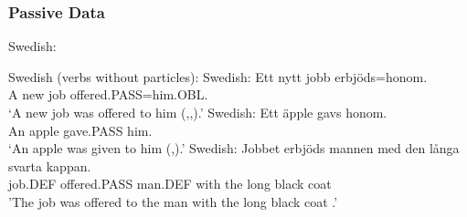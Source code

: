 \subsubsection{Passive Data}
\begin{exe}
	 Swedish:
	\begin{xlist}
	\end{xlist}	
	 Swedish (verbs without particles):
	 Swedish:
		\gll Ett nytt jobb erbjöds=honom.\\
		A new job offered.PASS=him.OBL.\\
		\trans `A new job was offered to him (\citealt{Anward.1989},\citealt{Falk.1990},\citealt{Lundquist.2006}).'
	 Swedish:
		\gll *Ett äpple gavs honom.\\
		 An apple gave.PASS him.\\
		 \trans `An apple was given to him (\citealt{Anward.1989},\citealt{Lundquist.2006}).'
	  Swedish:
		\gll Jobbet erbjöds mannen med den långa svarta kappan.\\
		job.DEF offered.PASS man.DEF with the long black coat\\
		'The job was offered to the man with the long black coat \citep[ex 26]{Lundquist.2004}.'


\end{exe}
